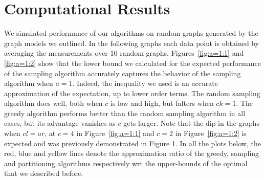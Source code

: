 \section{Computational Results}

We simulated performance of our algorithms on random graphs generated
by the graph models we outlined. In the following graphs each data
point is obtained by averaging the measurements over 10 random
graphs. Figures~\ref{fig:a=1:1} and \ref{fig:a=1:2} show that the
lower bound we calculated for the expected performance of the sampling
algorithm accurately captures the behavior of the sampling algorithm
when $a=1$. Indeed, the inequality we used is an accurate
approximation of the expectation, up to lower order terms. The random
sampling algorithm does well, both when $c$ is low and high, but
falters when $ck=1$. The greedy algorithm performs better than the
random sampling algorithm in all cases, but its advantage vanishes as
$c$ gets larger. Note that the dip in the graphs when $cl=ar$, at
$c=4$ in Figure~\ref{fig:a=1:1} and $c=2$ in Figure~\ref{fig:a=1:2} is
expected and was previously demonstrated in Figure 1.  In all the
plots below, the red, blue and yellow lines denote the approximation
ratio of the greedy, sampling and partitioning algorithms respectively
wrt the upper-bounds of the optimal that we described before.

